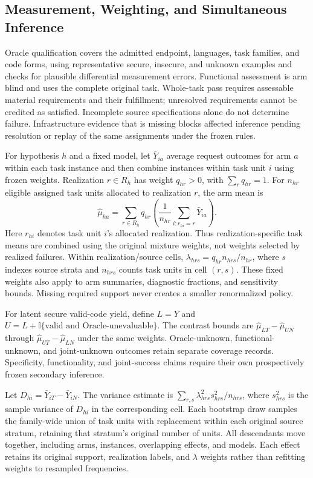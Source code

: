 \subsection{Measurement, Weighting, and Simultaneous Inference}
\label{app:inference-details}

Oracle qualification covers the admitted endpoint, languages, task families,
and code forms, using representative secure, insecure, and unknown examples
and checks for plausible differential measurement errors. Functional assessment
is arm blind and uses the complete original task. Whole-task pass requires
assessable material requirements and their fulfillment; unresolved requirements
cannot be credited as satisfied. Incomplete source specifications alone do not
determine failure. Infrastructure evidence that is missing blocks affected
inference pending resolution or replay of the same assignments under the
frozen rules.

For hypothesis $h$ and a fixed model, let $\bar Y_{ia}$ average request outcomes
for arm $a$ within each task instance and then combine instances within task
unit $i$ using frozen weights. Realization $r\in R_h$ has weight $q_{hr}>0$,
with $\sum_r q_{hr}=1$. For $n_{hr}$ eligible assigned task units allocated to
realization $r$, the arm mean is
\begin{equation}
  \widehat\mu_{ha}
  =\sum_{r\in R_h}q_{hr}
     \left(\frac{1}{n_{hr}}\sum_{i:r_{hi}=r}\bar Y_{ia}\right).
\end{equation}
Here $r_{hi}$ denotes task unit $i$'s allocated realization.
Thus realization-specific task means are combined using the original mixture
weights, not weights selected by realized failures. Within realization/source
cells, $\lambda_{hrs}=q_{hr}n_{hrs}/n_{hr}$, where $s$ indexes source strata
and $n_{hrs}$ counts task units in cell $(r,s)$. These fixed weights also apply to
arm summaries, diagnostic fractions, and sensitivity bounds. Missing required
support never creates a smaller renormalized policy.

For latent secure valid-code yield, define $L=Y$ and
$U=L+\mathbb I\{\text{valid and Oracle-unevaluable}\}$. The contrast bounds are
$\widehat\mu_{LT}-\widehat\mu_{UN}$ through
$\widehat\mu_{UT}-\widehat\mu_{LN}$ under the same weights. Oracle-unknown,
functional-unknown, and joint-unknown outcomes retain separate coverage records.
Specificity, functionality, and joint-success claims require their own
prospectively frozen secondary inference.

Let $D_{hi}=\bar Y_{iT}-\bar Y_{iN}$. The variance estimate is
$\sum_{r,s}\lambda_{hrs}^{2}s_{hrs}^{2}/n_{hrs}$, where $s_{hrs}^{2}$ is the
sample variance of $D_{hi}$ in the corresponding cell. Each bootstrap draw
samples the family-wide union of task units with replacement within each
original source stratum, retaining that stratum's original number of units.
All descendants move together, including arms, instances, overlapping effects,
and models. Each effect retains its original support, realization labels,
and $\lambda$ weights rather than refitting weights to resampled frequencies.

